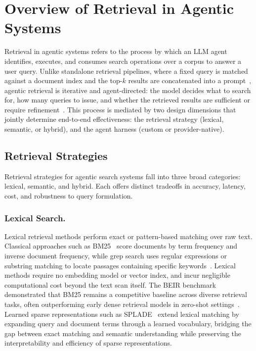 \documentclass[sigconf,nonacm]{acmart}
\begin{document}

\section{Overview of Retrieval in Agentic Systems}
\label{sec:overview}

Retrieval in agentic systems refers to the process by which an LLM agent identifies, executes, and consumes search operations over a corpus to answer a user query. Unlike standalone retrieval pipelines, where a fixed query is matched against a document index and the top-$k$ results are concatenated into a prompt~\cite{lewis2020rag,gao2024ragsurvey}, agentic retrieval is iterative and agent-directed: the model decides what to search for, how many queries to issue, and whether the retrieved results are sufficient or require refinement~\cite{yao2023react,jiang2023flare,asai2024selfrag}. This process is mediated by two design dimensions that jointly determine end-to-end effectiveness: the retrieval strategy (lexical, semantic, or hybrid), and the agent harness (custom or provider-native).

\subsection{Retrieval Strategies}
\label{sec:retrieval-strategies}

Retrieval strategies for agentic search systems fall into three broad categories: lexical, semantic, and hybrid. Each offers distinct tradeoffs in accuracy, latency, cost, and robustness to query formulation.

\subsubsection{Lexical Search.}
Lexical retrieval methods perform exact or pattern-based matching over raw text. Classical approaches such as BM25~\cite{lin2019neuralhype} score documents by term frequency and inverse document frequency, while grep search uses regular expressions or substring matching to locate passages containing specific keywords~\cite{lumer2025toolsurvey}. Lexical methods require no embedding model or vector index, and incur negligible computational cost beyond the text scan itself. The BEIR benchmark demonstrated that BM25 remains a competitive baseline across diverse retrieval tasks, often outperforming early dense retrieval models in zero-shot settings~\cite{thakur2021beir}. Learned sparse representations such as SPLADE~\cite{formal2021splade} extend lexical matching by expanding query and document terms through a learned vocabulary, bridging the gap between exact matching and semantic understanding while preserving the interpretability and efficiency of sparse representations.
\end{document}
